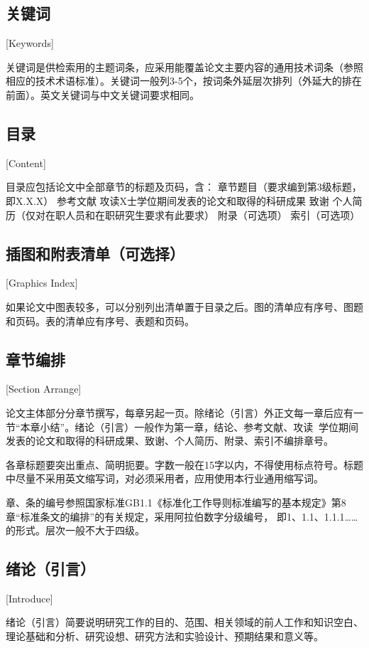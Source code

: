 \subsection{关键词}[Keywords]

关键词是供检索用的主题词条，应采用能覆盖论文主要内容的通用技术词条（参照相应的技术术语标准）。关键词一般列3-5个，按词条外延层次排列（外延大的排在前面）。英文关键词与中文关键词要求相同。

\subsection{目录}[Content]

目录应包括论文中全部章节的标题及页码，含：
章节题目（要求编到第3级标题，即X.X.X）
参考文献
攻读X士学位期间发表的论文和取得的科研成果
致谢
个人简历（仅对在职人员和在职研究生要求有此要求）
附录（可选项）
索引（可选项）

\subsection{插图和附表清单（可选择）}[Graphics Index]

如果论文中图表较多，可以分别列出清单置于目录之后。图的清单应有序号、图题和页码。表的清单应有序号、表题和页码。

\subsection{章节编排}[Section Arrange]

论文主体部分分章节撰写，每章另起一页。除绪论（引言）外正文每一章后应有一节“本章小结”。绪论（引言）一般作为第一章，结论、参考文献、攻读学位期间发表的论文和取得的科研成果、致谢、个人简历、附录、索引不编排章号。

各章标题要突出重点、简明扼要。字数一般在15字以内，不得使用标点符号。标题中尽量不采用英文缩写词，对必须采用者，应用使用本行业通用缩写词。

章、条的编号参照国家标准GB1.1《标准化工作导则标准编写的基本规定》第8章“标准条文的编排”的有关规定，采用阿拉伯数字分级编号，
即1、1.1、1.1.1……的形式。层次一般不大于四级。

\subsection{绪论（引言）}[Introduce]

绪论（引言）简要说明研究工作的目的、范围、相关领域的前人工作和知识空白、理论基础和分析、研究设想、研究方法和实验设计、预期结果和意义等。

